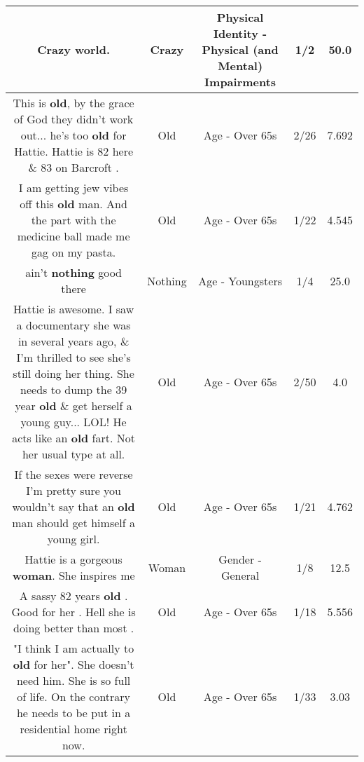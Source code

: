 \documentclass[11pt]{article}
\newlength\mylength
\begin{document}
\begin{center}
\begin{longtable}{|C{.65\mylength}|C{.30\mylength}|C{.12\mylength}|C{.12\mylength}|C{.12\mylength}|}
  \small Crazy world.\normalsize   & Crazy & Physical Identity - Physical (and Mental) Impairments & 1/2 & 50.0 \\  \hline
  \small This is \textbf{old}, by the grace of God they didn't work out... he's too \textbf{old} for Hattie. Hattie is 82 here \& 83 on Barcroft .\normalsize   & Old & Age - Over 65s & 2/26 & 7.692 \\  \hline
  \small I am getting jew vibes off this \textbf{old} man. And the part with the medicine ball made me gag on my pasta.\normalsize   & Old & Age - Over 65s & 1/22 & 4.545 \\  \hline
  \small ain't \textbf{nothing} good there\normalsize   & Nothing & Age - Youngsters & 1/4 & 25.0 \\  \hline
  \small Hattie is awesome. I saw a documentary she was in several years ago, \& I'm thrilled to see she's still doing her thing. She needs to dump the 39 year \textbf{old} \& get herself a young guy... LOL! He acts like an \textbf{old} fart. Not her usual type at all.\normalsize   & Old & Age - Over 65s & 2/50 & 4.0 \\  \hline
  \small If the sexes were reverse I'm pretty sure you wouldn't say that an \textbf{old} man should get himself a young girl.\normalsize   & Old & Age - Over 65s & 1/21 & 4.762 \\  \hline
  \small Hattie is a gorgeous \textbf{woman}. She inspires me\normalsize   & Woman & Gender - General & 1/8 & 12.5 \\  \hline
  \small A sassy 82 years \textbf{old} . Good for her . Hell she is doing better than most .\normalsize   & Old & Age - Over 65s & 1/18 & 5.556 \\  \hline
  \small "I think I am actually to \textbf{old} for her". She doesn't need him. She is so full of life. On the contrary he needs to be put in a residential home right now.\normalsize   & Old & Age - Over 65s & 1/33 & 3.03 \\  \hline

\end{longtable}
\end{center}
\end{document}
